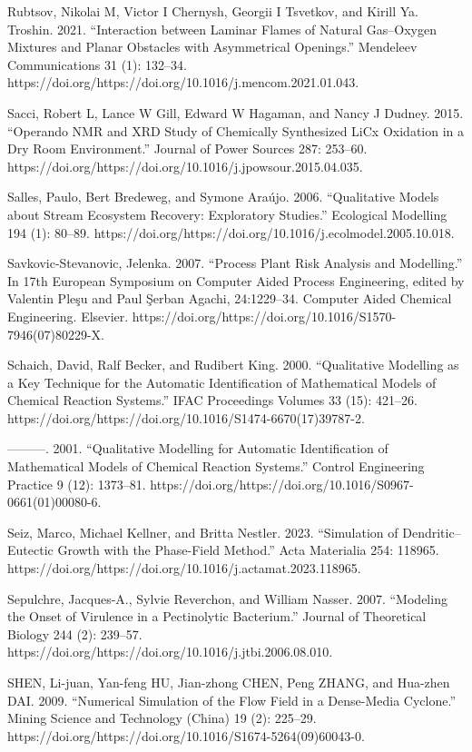 \documentclass[utf8]{gradu3}
\begin{document}
Rubtsov, Nikolai M, Victor I Chernysh, Georgii I Tsvetkov, and Kirill Ya. Troshin. 2021. “Interaction between Laminar Flames of Natural Gas–Oxygen Mixtures and Planar Obstacles with Asymmetrical Openings.” Mendeleev Communications 31 (1): 132–34. https://doi.org/https://doi.org/10.1016/j.mencom.2021.01.043.

Sacci, Robert L, Lance W Gill, Edward W Hagaman, and Nancy J Dudney. 2015. “Operando NMR and XRD Study of Chemically Synthesized LiCx Oxidation in a Dry Room Environment.” Journal of Power Sources 287: 253–60. https://doi.org/https://doi.org/10.1016/j.jpowsour.2015.04.035.

Salles, Paulo, Bert Bredeweg, and Symone Araújo. 2006. “Qualitative Models about Stream Ecosystem Recovery: Exploratory Studies.” Ecological Modelling 194 (1): 80–89. https://doi.org/https://doi.org/10.1016/j.ecolmodel.2005.10.018.

Savkovic-Stevanovic, Jelenka. 2007. “Process Plant Risk Analysis and Modelling.” In 17th European Symposium on Computer Aided Process Engineering, edited by Valentin Pleşu and Paul Şerban Agachi, 24:1229–34. Computer Aided Chemical Engineering. Elsevier. https://doi.org/https://doi.org/10.1016/S1570-7946(07)80229-X.

Schaich, David, Ralf Becker, and Rudibert King. 2000. “Qualitative Modelling as a Key Technique for the Automatic Identification of Mathematical Models of Chemical Reaction Systems.” IFAC Proceedings Volumes 33 (15): 421–26. https://doi.org/https://doi.org/10.1016/S1474-6670(17)39787-2.

———. 2001. “Qualitative Modelling for Automatic Identification of Mathematical Models of Chemical Reaction Systems.” Control Engineering Practice 9 (12): 1373–81. https://doi.org/https://doi.org/10.1016/S0967-0661(01)00080-6.

Seiz, Marco, Michael Kellner, and Britta Nestler. 2023. “Simulation of Dendritic–Eutectic Growth with the Phase-Field Method.” Acta Materialia 254: 118965. https://doi.org/https://doi.org/10.1016/j.actamat.2023.118965.

Sepulchre, Jacques-A., Sylvie Reverchon, and William Nasser. 2007. “Modeling the Onset of Virulence in a Pectinolytic Bacterium.” Journal of Theoretical Biology 244 (2): 239–57. https://doi.org/https://doi.org/10.1016/j.jtbi.2006.08.010.

SHEN, Li-juan, Yan-feng HU, Jian-zhong CHEN, Peng ZHANG, and Hua-zhen DAI. 2009. “Numerical Simulation of the Flow Field in a Dense-Media Cyclone.” Mining Science and Technology (China) 19 (2): 225–29. https://doi.org/https://doi.org/10.1016/S1674-5264(09)60043-0.
\end{document}
